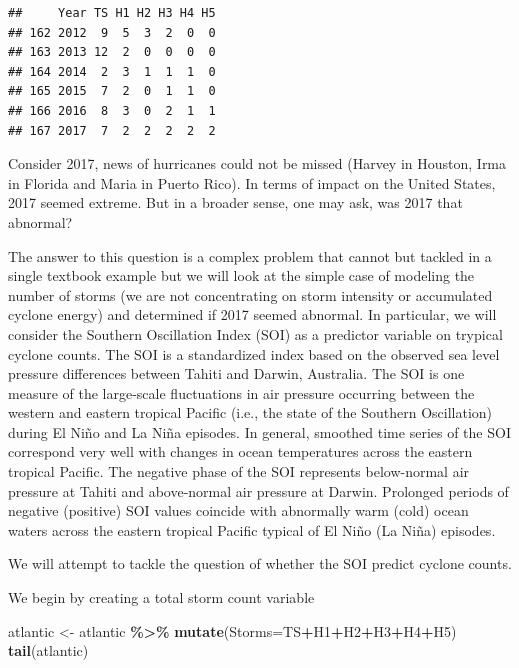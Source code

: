 \documentclass[
]{book}
\newenvironment{Shaded}{\begin{snugshade}}{\end{snugshade}}
\newcommand{\AttributeTok}[1]{\textcolor[rgb]{0.13,0.29,0.53}{#1}}
\newcommand{\FunctionTok}[1]{\textcolor[rgb]{0.13,0.29,0.53}{\textbf{#1}}}
\newcommand{\NormalTok}[1]{#1}
\newcommand{\OtherTok}[1]{\textcolor[rgb]{0.56,0.35,0.01}{#1}}
\newcommand{\SpecialCharTok}[1]{\textcolor[rgb]{0.81,0.36,0.00}{\textbf{#1}}}
\begin{document}
\begin{verbatim}
##     Year TS H1 H2 H3 H4 H5
## 162 2012  9  5  3  2  0  0
## 163 2013 12  2  0  0  0  0
## 164 2014  2  3  1  1  1  0
## 165 2015  7  2  0  1  1  0
## 166 2016  8  3  0  2  1  1
## 167 2017  7  2  2  2  2  2
\end{verbatim}

Consider 2017, news of hurricanes could not be missed (Harvey in Houston, Irma in Florida and Maria in Puerto Rico). In terms of impact on the United States, 2017 seemed extreme. But in a broader sense, one may ask, was 2017 that abnormal?

The answer to this question is a complex problem that cannot but tackled in a single textbook example but we will look at the simple case of modeling the number of storms (we are not concentrating on storm intensity or accumulated cyclone energy) and determined if 2017 seemed abnormal. In particular, we will consider the Southern Oscillation Index (SOI) as a predictor variable on trypical cyclone counts. The SOI is a standardized index based on the observed sea level pressure differences between Tahiti and Darwin, Australia. The SOI is one measure of the large-scale fluctuations in air pressure occurring between the western and eastern tropical Pacific (i.e., the state of the Southern Oscillation) during El Niño and La Niña episodes. In general, smoothed time series of the SOI correspond very well with changes in ocean temperatures across the eastern tropical Pacific. The negative phase of the SOI represents below-normal air pressure at Tahiti and above-normal air pressure at Darwin. Prolonged periods of negative (positive) SOI values coincide with abnormally warm (cold) ocean waters across the eastern tropical Pacific typical of El Niño (La Niña) episodes.

We will attempt to tackle the question of whether the SOI predict cyclone counts.

We begin by creating a total storm count variable

\begin{Shaded}
\begin{Highlighting}[]
\NormalTok{atlantic }\OtherTok{\textless{}{-}}\NormalTok{ atlantic }\SpecialCharTok{\%\textgreater{}\%}
  \FunctionTok{mutate}\NormalTok{(}\AttributeTok{Storms=}\NormalTok{TS}\SpecialCharTok{+}\NormalTok{H1}\SpecialCharTok{+}\NormalTok{H2}\SpecialCharTok{+}\NormalTok{H3}\SpecialCharTok{+}\NormalTok{H4}\SpecialCharTok{+}\NormalTok{H5)}
\FunctionTok{tail}\NormalTok{(atlantic)}
\end{Highlighting}
\end{Shaded}
\end{document}
